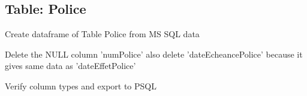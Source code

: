 \subsection{Table: Police}

Create dataframe of Table Police from MS SQL data
\begin{figure}[H]
\centering
{}
\end{figure}
\begin{figure}[H]
\centering
{}
\end{figure}

Delete the NULL column 'numPolice' also delete 'dateEcheancePolice' because it gives same data as 'dateEffetPolice'
\begin{figure}[H]
\centering
{}
\end{figure}

Verify column types and export to PSQL
\begin{figure}[H]
\centering
{}
\end{figure}

